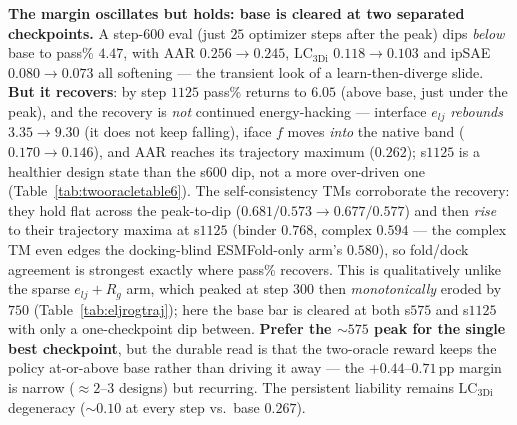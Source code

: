 \documentclass[11pt]{article}
\begin{document}
\textbf{The margin oscillates but holds: base is cleared at two separated checkpoints.} A step-$600$
eval (just $25$ optimizer steps after the peak) dips \emph{below} base to pass\% $4.47$, with AAR
$0.256\!\to\!0.245$, $\mathrm{LC}_{\mathrm{3Di}}$ $0.118\!\to\!0.103$ and ipSAE $0.080\!\to\!0.073$ all
softening --- the transient look of a learn-then-diverge slide. \textbf{But it recovers}: by step
$1125$ pass\% returns to $6.05$ (above base, just under the peak), and the recovery is \emph{not}
continued energy-hacking --- interface $e_{lj}$ \emph{rebounds} $3.35\!\to\!9.30$ (it does not keep
falling), iface $f$ moves \emph{into} the native band ($0.170\!\to\!0.146$), and AAR reaches its
trajectory maximum ($0.262$); s$1125$ is a healthier design state than the s$600$ dip, not a more
over-driven one (Table~\ref{tab:twooracletable6}). The self-consistency TMs corroborate the recovery:
they hold flat across the peak-to-dip ($0.681/0.573\to0.677/0.577$) and then \emph{rise} to their
trajectory maxima at s$1125$ (binder $0.768$, complex $0.594$ --- the complex TM even edges the
docking-blind ESMFold-only arm's $0.580$), so fold/dock agreement is strongest exactly where pass\%
recovers. This is
qualitatively unlike the sparse $e_{lj}+R_g$ arm, which peaked at step $300$ then \emph{monotonically}
eroded by $750$ (Table~\ref{tab:eljrogtraj}); here the base bar is cleared at both s$575$ and s$1125$
with only a one-checkpoint dip between. \textbf{Prefer the $\sim\!575$ peak for the single best
checkpoint}, but the durable read is that the two-oracle reward keeps the policy at-or-above base
rather than driving it away --- the $+0.44$--$0.71$\,pp margin is narrow ($\approx2$--$3$ designs) but
recurring. The persistent liability remains $\mathrm{LC}_{\mathrm{3Di}}$ degeneracy ($\sim\!0.10$ at
every step vs.\ base $0.267$).
\end{document}
